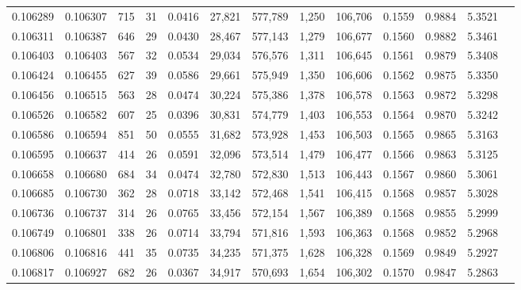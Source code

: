 \begin{tabular}{rrrrrrrrrrrrr}
0.106289 & 0.106307 &   715 &  31 &                                     0.0416 &  27,821 & 577,789 &   1,250 & 106,706 & 0.1559 & 0.9884 & 5.3521 \\
0.106311 & 0.106387 &   646 &  29 &                                     0.0430 &  28,467 & 577,143 &   1,279 & 106,677 & 0.1560 & 0.9882 & 5.3461 \\
0.106403 & 0.106403 &   567 &  32 &                                     0.0534 &  29,034 & 576,576 &   1,311 & 106,645 & 0.1561 & 0.9879 & 5.3408 \\
0.106424 & 0.106455 &   627 &  39 &                                     0.0586 &  29,661 & 575,949 &   1,350 & 106,606 & 0.1562 & 0.9875 & 5.3350 \\
0.106456 & 0.106515 &   563 &  28 &                                     0.0474 &  30,224 & 575,386 &   1,378 & 106,578 & 0.1563 & 0.9872 & 5.3298 \\
0.106526 & 0.106582 &   607 &  25 &                                     0.0396 &  30,831 & 574,779 &   1,403 & 106,553 & 0.1564 & 0.9870 & 5.3242 \\
0.106586 & 0.106594 &   851 &  50 &                                     0.0555 &  31,682 & 573,928 &   1,453 & 106,503 & 0.1565 & 0.9865 & 5.3163 \\
0.106595 & 0.106637 &   414 &  26 &                                     0.0591 &  32,096 & 573,514 &   1,479 & 106,477 & 0.1566 & 0.9863 & 5.3125 \\
0.106658 & 0.106680 &   684 &  34 &                                     0.0474 &  32,780 & 572,830 &   1,513 & 106,443 & 0.1567 & 0.9860 & 5.3061 \\
0.106685 & 0.106730 &   362 &  28 &                                     0.0718 &  33,142 & 572,468 &   1,541 & 106,415 & 0.1568 & 0.9857 & 5.3028 \\
0.106736 & 0.106737 &   314 &  26 &                                     0.0765 &  33,456 & 572,154 &   1,567 & 106,389 & 0.1568 & 0.9855 & 5.2999 \\
0.106749 & 0.106801 &   338 &  26 &                                     0.0714 &  33,794 & 571,816 &   1,593 & 106,363 & 0.1568 & 0.9852 & 5.2968 \\
0.106806 & 0.106816 &   441 &  35 &                                     0.0735 &  34,235 & 571,375 &   1,628 & 106,328 & 0.1569 & 0.9849 & 5.2927 \\
0.106817 & 0.106927 &   682 &  26 &                                     0.0367 &  34,917 & 570,693 &   1,654 & 106,302 & 0.1570 & 0.9847 & 5.2863 \\

\end{tabular}

